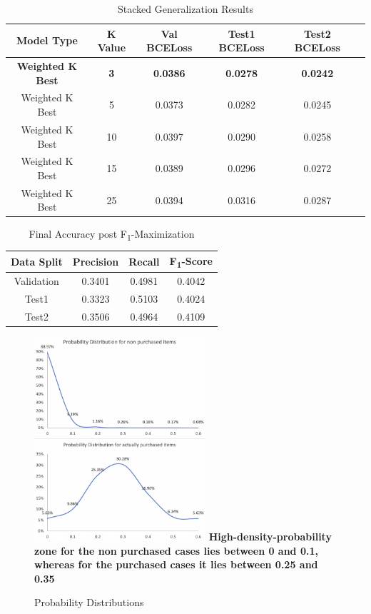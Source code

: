 \begin{table}[t]
\caption{ Stacked Generalization Results}
\vspace{0.1 in}
\centering
\resizebox{3.3in}{!}
{%
\begin{tabular}{|c|c|c|c|c|c|}
\hline
{\bf Model Type} & {\bf K Value} & {\bf Val BCELoss} & {\bf Test1 BCELoss} & {\bf Test2 BCELoss} \\ 
\hline\hline 
{\bf Weighted K Best}	  &  {\bf 3}  &  {\bf 0.0386} &  {\bf 0.0278} &  {\bf 0.0242}  \\ \hline
Weighted K Best	  		&  5  &  0.0373 &  0.0282 &  0.0245  \\ \hline
Weighted K Best	  		 &  10 &  0.0397 &  0.0290 &  0.0258  \\ \hline
Weighted K Best	  		 &  15 &  0.0389 &  0.0296 &  0.0272  \\ \hline
Weighted K Best	  		&  25  &  0.0394 &  0.0316 &  0.0287  \\ \hline
\end{tabular}
}
\label{tab:stacking}
\end{table}

\begin{table}[t]
\caption{Final Accuracy post F\textsubscript{1}-Maximization}
\vspace{0.1 in}
\centering
\resizebox{2.5in}{!}
{%
\begin{tabular}{|c|c|c|c|}
\hline
{\bf Data Split} & {\bf Precision} & {\bf Recall} & {\bf F\textsubscript{1}-Score} \\ 
\hline\hline 
Validation	  	 &  0.3401 &  0.4981 &  0.4042  \\ \hline
Test1	  		 &  0.3323 &  0.5103 &  0.4024  \\ \hline
Test2	  		 & 0.3506 &  0.4964 &  0.4109 \\ \hline
\end{tabular}
}
\label{tab:Fscore}
\end{table}

  \begin{figure}[t]
    \centering 
    \caption{Probability Distributions} 
    \includegraphics[width=2.5in]{img/density.png} 
    {\bf High-density-probability zone for the non purchased cases lies between 0 and 
    0.1, whereas for the purchased cases it lies between 0.25 and 0.35}
    \label{fig:density} 
  \end{figure}

